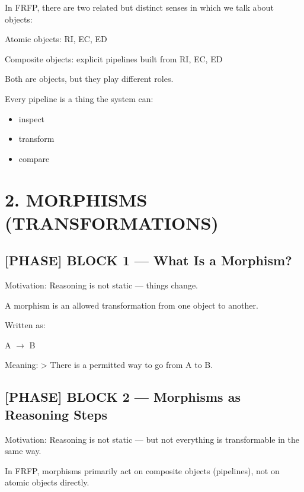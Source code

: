 In FRFP, there are two related but distinct senses in which we talk about objects:\par

Atomic objects: RI, EC, ED\par

Composite objects: explicit pipelines built from RI, EC, ED\par

Both are objects, but they play different roles.\par

Every pipeline is a thing the system can:\n\n\begin{itemize}\n\item inspect
\item transform
\item compare\n\end{itemize}

\section*{2. MORPHISMS (TRANSFORMATIONS)}

\subsection*{[PHASE] BLOCK 1 --- What Is a Morphism?}

Motivation: Reasoning is not static --- things change.\par

A morphism is an allowed transformation from one object to another.\par

Written as:\par

A $\to$ B\par

Meaning: > There is a permitted way to go from A to B. \par

\subsection*{[PHASE] BLOCK 2 --- Morphisms as Reasoning Steps}

Motivation: Reasoning is not static --- but not everything is transformable in the same way.\par

In FRFP, morphisms primarily act on composite objects (pipelines), not on atomic objects directly.\par

